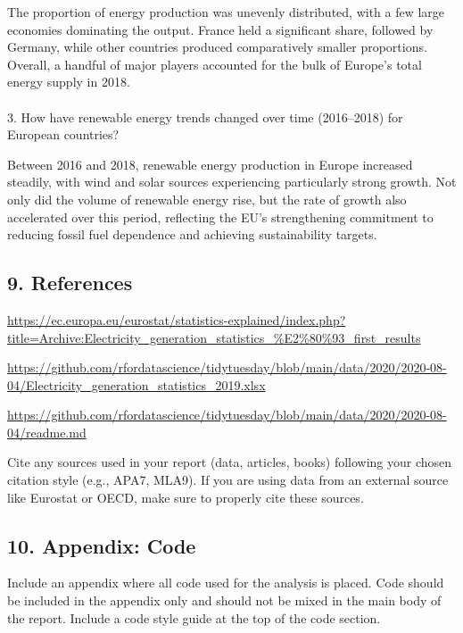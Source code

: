 \documentclass[
  letterpaper,
  DIV=11,
  numbers=noendperiod]{scrartcl}
\makeatletter
\let\oldparagraph\paragraph
\renewcommand{\paragraph}{
    \@ifstar
      \xxxParagraphStar
      \xxxParagraphNoStar
  }
\newcommand{\xxxParagraphStar}[1]{\oldparagraph*{#1}\mbox{}}
\newcommand{\xxxParagraphNoStar}[1]{\oldparagraph{#1}\mbox{}}
\makeatother
\begin{document}
The proportion of energy production was unevenly distributed, with a few
large economies dominating the output. France held a significant share,
followed by Germany, while other countries produced comparatively
smaller proportions. Overall, a handful of major players accounted for
the bulk of Europe's total energy supply in 2018.

\paragraph{3. How have renewable energy trends changed over time
(2016--2018) for European
countries?}\label{how-have-renewable-energy-trends-changed-over-time-20162018-for-european-countries}

Between 2016 and 2018, renewable energy production in Europe increased
steadily, with wind and solar sources experiencing particularly strong
growth. Not only did the volume of renewable energy rise, but the rate
of growth also accelerated over this period, reflecting the EU's
strengthening commitment to reducing fossil fuel dependence and
achieving sustainability targets.

\subsection{9. References~}\label{references}

\url{https://ec.europa.eu/eurostat/statistics-explained/index.php?title=Archive:Electricity_generation_statistics_\%E2\%80\%93_first_results}

\url{https://github.com/rfordatascience/tidytuesday/blob/main/data/2020/2020-08-04/Electricity_generation_statistics_2019.xlsx}

\url{https://github.com/rfordatascience/tidytuesday/blob/main/data/2020/2020-08-04/readme.md}

Cite any sources used in your report (data, articles, books) following
your chosen citation style (e.g., APA7, MLA9). If you are using data
from an external source like Eurostat or OECD, make sure to properly
cite these sources.~

\subsection{10. Appendix: Code~}\label{appendix-code}

Include an appendix where all code used for the analysis is placed. Code
should be included in the appendix only and should not be mixed in the
main body of the report. Include a code style guide at the top of the
code section.
\end{document}
